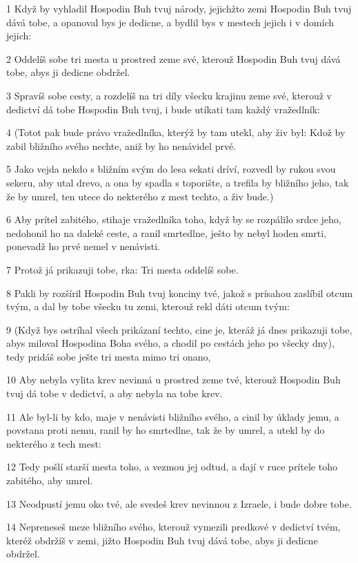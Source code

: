 \par 1 Když by vyhladil Hospodin Buh tvuj národy, jejichžto zemi Hospodin Buh tvuj dává tobe, a opanoval bys je dedicne, a bydlil bys v mestech jejich i v domích jejich:
\par 2 Oddelíš sobe tri mesta u prostred zeme své, kterouž Hospodin Buh tvuj dává tobe, abys ji dedicne obdržel.
\par 3 Spravíš sobe cesty, a rozdelíš na tri díly všecku krajinu zeme své, kterouž v dedictví dá tobe Hospodin Buh tvuj, i bude utíkati tam každý vražedlník:
\par 4 (Totot pak bude právo vražedlníka, kterýž by tam utekl, aby živ byl: Kdož by zabil bližního svého nechte, aniž by ho nenávidel prvé.
\par 5 Jako vejda nekdo s bližním svým do lesa sekati dríví, rozvedl by rukou svou sekeru, aby utal drevo, a ona by spadla s toporište, a trefila by bližního jeho, tak že by umrel, ten utece do nekterého z mest techto, a živ bude.)
\par 6 Aby prítel zabitého, stihaje vražedlníka toho, když by se rozpálilo srdce jeho, nedohonil ho na daleké ceste, a ranil smrtedlne, ješto by nebyl hoden smrti, ponevadž ho prvé nemel v nenávisti.
\par 7 Protož já prikazuji tobe, rka: Tri mesta oddelíš sobe.
\par 8 Pakli by rozšíril Hospodin Buh tvuj konciny tvé, jakož s prísahou zaslíbil otcum tvým, a dal by tobe všecku tu zemi, kterouž rekl dáti otcum tvým:
\par 9 (Když bys ostríhal všech prikázaní techto, cine je, kteráž já dnes prikazuji tobe, abys miloval Hospodina Boha svého, a chodil po cestách jeho po všecky dny), tedy pridáš sobe ješte tri mesta mimo tri onano,
\par 10 Aby nebyla vylita krev nevinná u prostred zeme tvé, kterouž Hospodin Buh tvuj dá tobe v dedictví, a aby nebyla na tobe krev.
\par 11 Ale byl-li by kdo, maje v nenávisti bližního svého, a cinil by úklady jemu, a povstana proti nemu, ranil by ho smrtedlne, tak že by umrel, a utekl by do nekterého z tech mest:
\par 12 Tedy pošlí starší mesta toho, a vezmou jej odtud, a dají v ruce prítele toho zabitého, aby umrel.
\par 13 Neodpustí jemu oko tvé, ale svedeš krev nevinnou z Izraele, i bude dobre tobe.
\par 14 Nepreneseš meze bližního svého, kterouž vymezili predkové v dedictví tvém, kteréž obdržíš v zemi, jižto Hospodin Buh tvuj dává tobe, abys ji dedicne obdržel.
